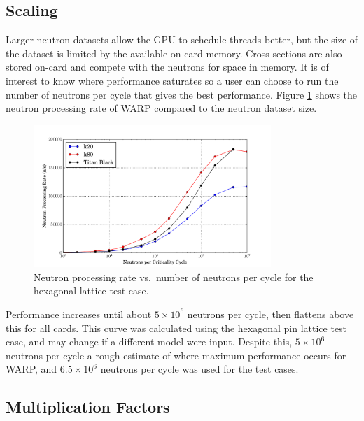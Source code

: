 \documentclass[preprint,12pt]{elsarticle}
\begin{document}
\subsection{Scaling}

Larger neutron datasets allow the GPU to schedule threads better, but the size of the dataset is limited by the available on-card memory.  Cross sections are also stored on-card and compete with the neutrons for space in memory.  It is of interest to know where performance saturates so a user can choose to run the number of neutrons per cycle that gives the best performance.  Figure \ref{scaling} shows the neutron processing rate of WARP compared to the neutron dataset size.

\begin{figure}[h!]
\centering
\includegraphics[width=0.8\textwidth,trim= 1cm 0cm 1cm 0cm]{graphics/scaling.pdf}
\caption{Neutron processing rate vs.\ number of neutrons per cycle for the hexagonal lattice test case. \label{scaling} }
\end{figure}

Performance increases until about $5\times10^6$ neutrons per cycle, then flattens above this for all cards.  This curve was calculated using the hexagonal pin lattice test case, and may change if a different model were input.  Despite this, $5\times10^6$ neutrons per cycle a rough estimate of where maximum performance occurs for WARP, and $6.5\times10^6$ neutrons per cycle was used for the test cases. 

\subsection{Multiplication Factors}
\end{document}
